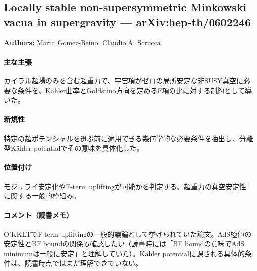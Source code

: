 \subsection{Locally stable non-supersymmetric Minkowski vacua in supergravity --- arXiv:hep-th/0602246}

\textbf{Authors:} Marta Gomez-Reino, Claudio A. Scrucca

\paragraph{主な主張}
カイラル超場のみを含む超重力で、宇宙項がゼロの局所安定な非SUSY真空に必要な条件を、K\"ahler曲率とGoldstino方向を定めるF項の比に対する制約として導いた\cite{Gomez-Reino:2006tjy}。

\paragraph{新規性}
特定の超ポテンシャルを選ぶ前に適用できる幾何学的な必要条件を抽出し、分離型K\"ahler potentialでその意味を具体化した。

\paragraph{位置付け}
モジュライ安定化やF-term upliftingが可能かを判定する、超重力の真空安定性に関する一般的枠組み。

\paragraph{コメント（読書メモ）}
O'KKLT\cite{Kallosh:2006dv}でF-term upliftingの一般的議論として挙げられていた論文。AdS極値の安定性とBF boundの関係も確認したい（読書時には「BF boundの意味でAdS minimumは一般に安定」と理解していた）。K\"ahler potentialに課される具体的条件は、読書時点ではまだ理解できていない。
